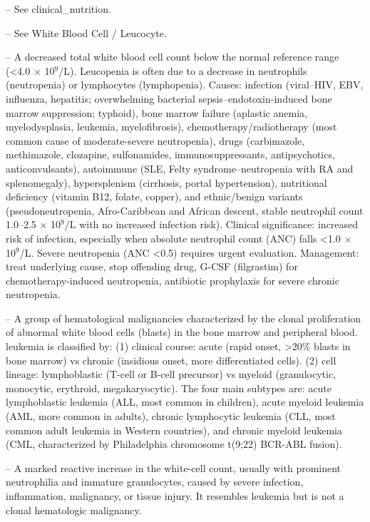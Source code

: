 -- See clinical\_nutrition.

-- See White Blood Cell / Leucocyte.

-- A decreased total white blood cell count below the normal reference range (<4.0 $\times$ 10$^9$/L). Leucopenia is often due to a decrease in neutrophils (neutropenia) or lymphocytes (lymphopenia). Causes: infection (viral--HIV, EBV, influenza, hepatitis; overwhelming bacterial sepsis--endotoxin-induced bone marrow suppression; typhoid), bone marrow failure (aplastic anemia, myelodysplasia, leukemia, myelofibrosis), chemotherapy/radiotherapy (most common cause of moderate-severe neutropenia), drugs (carbimazole, methimazole, clozapine, sulfonamides, immunosuppressants, antipsychotics, anticonvulsants), autoimmune (SLE, Felty syndrome--neutropenia with RA and splenomegaly), hypersplenism (cirrhosis, portal hypertension), nutritional deficiency (vitamin B12, folate, copper), and ethnic/benign variants (pseudoneutropenia, Afro-Caribbean and African descent, stable neutrophil count 1.0--2.5 $\times$ 10$^9$/L with no increased infection risk). Clinical significance: increased risk of infection, especially when absolute neutrophil count (ANC) falls <1.0 $\times$ 10$^9$/L. Severe neutropenia (ANC <0.5) requires urgent evaluation. Management: treat underlying cause, stop offending drug, G-CSF (filgrastim) for chemotherapy-induced neutropenia, antibiotic prophylaxis for severe chronic neutropenia.

-- A group of hematological malignancies characterized by the clonal proliferation of abnormal white blood cells (blasts) in the bone marrow and peripheral blood. leukemia is classified by: (1) clinical course: acute (rapid onset, >20\% blasts in bone marrow) vs chronic (insidious onset, more differentiated cells). (2) cell lineage: lymphoblastic (T-cell or B-cell precursor) vs myeloid (granulocytic, monocytic, erythroid, megakaryocytic). The four main subtypes are: acute lymphoblastic leukemia (ALL, most common in children), acute myeloid leukemia (AML, more common in adults), chronic lymphocytic leukemia (CLL, most common adult leukemia in Western countries), and chronic myeloid leukemia (CML, characterized by Philadelphia chromosome t(9;22) BCR-ABL fusion).

-- A marked reactive increase in the white-cell count, usually with prominent neutrophilia and immature granulocytes, caused by severe infection, inflammation, malignancy, or tissue injury. It resembles leukemia but is not a clonal hematologic malignancy.

